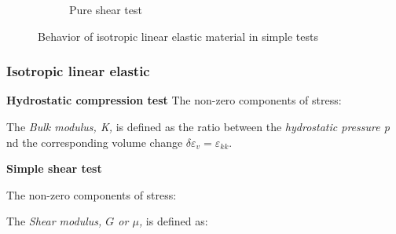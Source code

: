 \documentclass[notes]{beamer}
\begin{document}
\begin{frame}
\begin{figure}[t!]
\begin{subfigure}[t]{0.5\textwidth}
			\caption{Pure shear test}
		\end{subfigure}
		\caption{Behavior of isotropic linear elastic material in simple tests}
\end{figure}
\end{frame}

\begin{frame}
\frametitle{Isotropic linear elastic}
\textbf{Hydrostatic compression test}
The non-zero components of stress: 

The \textit{Bulk modulus, K,}  is defined as the ratio between the \textit{hydrostatic pressure p} nd the corresponding volume change $\delta \varepsilon_v = \varepsilon_{kk}$. 

\textbf{Simple shear test}

The non-zero components of stress: 

The \textit{Shear modulus, $G$ or $\mu$,}  is defined as: 



\end{frame}
\end{document}
